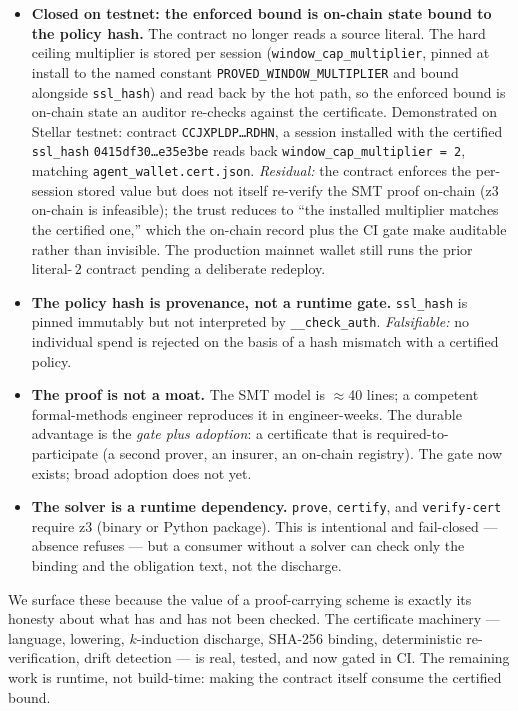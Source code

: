 \documentclass[11pt]{article}
\theoremstyle{plain}
\theoremstyle{definition}
\theoremstyle{remark}
\begin{document}
\begin{itemize}
\item \textbf{Closed on testnet: the enforced bound is on-chain state bound to
  the policy hash.} The contract no longer reads a source literal. The hard
  ceiling multiplier is stored per session (\texttt{window\_cap\_multiplier},
  pinned at install to the named constant \texttt{PROVED\_WINDOW\_MULTIPLIER}
  and bound alongside \texttt{ssl\_hash}) and read back by the hot path, so the
  enforced bound is on-chain state an auditor re-checks against the certificate.
  Demonstrated on Stellar testnet: contract
  \texttt{CCJXPLDP\ldots RDHN}, a session installed with the certified
  \texttt{ssl\_hash} \texttt{0415df30\ldots e35e3be} reads back
  \texttt{window\_cap\_multiplier = 2}, matching
  \texttt{agent\_wallet.cert.json}. \emph{Residual:} the contract enforces the
  per-session stored value but does not itself re-verify the SMT proof on-chain
  (z3 on-chain is infeasible); the trust reduces to ``the installed multiplier
  matches the certified one,'' which the on-chain record plus the CI gate make
  auditable rather than invisible. The production mainnet wallet still runs the
  prior literal-\,$2$ contract pending a deliberate redeploy.
\item \textbf{The policy hash is provenance, not a runtime gate.}
  \texttt{ssl\_hash} is pinned immutably but not interpreted by
  \texttt{\_\_check\_auth}. \emph{Falsifiable:} no individual spend is rejected
  on the basis of a hash mismatch with a certified policy.
\item \textbf{The proof is not a moat.} The SMT model is $\approx$40 lines; a
  competent formal-methods engineer reproduces it in engineer-weeks. The
  durable advantage is the \emph{gate plus adoption}: a certificate that is
  required-to-participate (a second prover, an insurer, an on-chain registry).
  The gate now exists; broad adoption does not yet.
\item \textbf{The solver is a runtime dependency.} \texttt{prove},
  \texttt{certify}, and \texttt{verify-cert} require z3 (binary or Python
  package). This is intentional and fail-closed --- absence refuses --- but a
  consumer without a solver can check only the binding and the obligation text,
  not the discharge.
\end{itemize}

\noindent We surface these because the value of a proof-carrying scheme is
exactly its honesty about what has and has not been checked. The certificate
machinery --- language, lowering, $k$-induction discharge, SHA-256 binding,
deterministic re-verification, drift detection --- is real, tested, and now
gated in CI. The remaining work is runtime, not build-time: making the contract
itself consume the certified bound.
\end{document}
